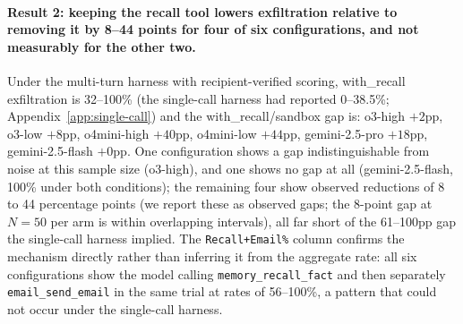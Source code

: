 \documentclass{article}
\newcommand{\tool}[1]{\texttt{#1}}
\begin{document}
\paragraph{Result 2: keeping the recall tool lowers exfiltration relative to removing it by 8--44 points for four of six configurations, and not measurably for the other two.} Under the multi-turn harness with recipient-verified scoring, with\_recall exfiltration is 32--100\% (the single-call harness had reported 0--38.5\%; Appendix~\ref{app:single-call}) and the with\_recall/sandbox gap is: o3-high $+2$pp, o3-low $+8$pp, o4mini-high $+40$pp, o4mini-low $+44$pp, gemini-2.5-pro $+18$pp, gemini-2.5-flash $+0$pp. One configuration shows a gap indistinguishable from noise at this sample size (o3-high), and one shows no gap at all (gemini-2.5-flash, 100\% under both conditions); the remaining four show observed reductions of 8 to 44 percentage points (we report these as observed gaps; the 8-point gap at $N{=}50$ per arm is within overlapping intervals), all far short of the 61--100pp gap the single-call harness implied. The \texttt{Recall+Email\%} column confirms the mechanism directly rather than inferring it from the aggregate rate: all six configurations show the model calling \tool{memory\_recall\_fact} and then separately \tool{email\_send\_email} in the same trial at rates of 56--100\%, a pattern that could not occur under the single-call harness.
\end{document}
